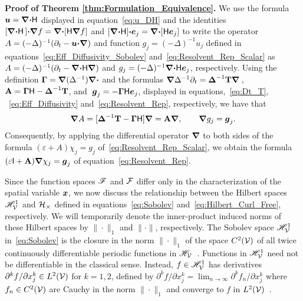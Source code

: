 \documentclass[amsa]{ipart}
\begin{document}
\textbf{Proof of Theorem \ref{thm:Formulation_Equivalence}.}\hspace{1ex}
%
We use the formula $\boldsymbol{u} =\mbox{\boldmath${\nabla}$} \mbox{\boldmath${\cdot}$}\mathsf{H}$ displayed in
equation~\eqref{eq:u_DH} and the identities
$[\mbox{\boldmath${\nabla}$}\mbox{\boldmath${\cdot}$}\mathsf{H}\,]\mbox{\boldmath${\cdot}$}\mbox{\boldmath${\nabla}$} f=\mbox{\boldmath${\nabla}$}\mbox{\boldmath${\cdot}$}[\mathsf{H}\mbox{\boldmath${\nabla}$} f]$
and $[\mbox{\boldmath${\nabla}$}\mbox{\boldmath${\cdot}$}\mathsf{H}]\mbox{\boldmath${\cdot}$}\boldsymbol{e}_j=\mbox{\boldmath${\nabla}$}\mbox{\boldmath${\cdot}$}[\mathsf{H}\boldsymbol{e}_j]$ to 
write the operator $A=(-\Delta)^{-1}(\partial_t-\boldsymbol{u}\mbox{\boldmath${\cdot}$}\mbox{\boldmath${\nabla}$})$ and function
$g_j=(-\Delta)^{-1}u_j$ defined in 
equations~\eqref{eq:Eff_Diffusivity_Sobolev}
and~\eqref{eq:Resolvent_Rep_Scalar} 
as $A=(-\Delta)^{-1}(\partial_t-\mbox{\boldmath${\nabla}$} \mbox{\boldmath${\cdot}$}\mathsf{H}\mbox{\boldmath${\nabla}$})$ and
$g_j=(-\Delta)^{-1}\mbox{\boldmath${\nabla}$} \mbox{\boldmath${\cdot}$}\mathsf{H}\boldsymbol{e} _j$, respectively. Using the definition
$\mbox{\boldmath${\Gamma}$}=\mbox{\boldmath${\nabla}$} (\Delta^{-1})\mbox{\boldmath${\nabla}$} \mbox{\boldmath${\cdot}$}$ and the formulas
$\mbox{\boldmath${\nabla}$} \Delta^{-1}\partial_t=\mbox{\boldmath${\Delta}$}^{-1}\mathbf{T}\mbox{\boldmath${\nabla}$} \,$,
$\mathbf{A}=\mbox{\boldmath${\Gamma}$}\mathsf{H}-\mbox{\boldmath${\Delta}$}^{-1}\mathbf{T}$, and 
$\;\boldsymbol{g}_j=-\mbox{\boldmath${\Gamma}$}\mathsf{H}\boldsymbol{e} _j$, 
displayed in equations,~\eqref{eq:Dt_T}, ~\eqref{eq:Eff_Diffusivity}
and~\eqref{eq:Resolvent_Rep}, respectively, we have that     
%
\begin{align}\label{eq:A_Ab_Relation}
  \bnabla A=[\bDelta^{-1}\Tb-\bGamma\Hm]\bnabla =\Ab\bnabla , \qquad
  \bnabla g_j=\vecg_j.
\end{align}
%
Consequently, by applying the
differential operator $\mbox{\boldmath${\nabla}$} $ to both sides of the formula
$(\varepsilon+A)\chi_j=g_j$ of~\eqref{eq:Resolvent_Rep_Scalar}, we obtain the
formula  $(\varepsilon\mathsf{I}+\mathbf{A})\mbox{\boldmath${\nabla}$} \chi_j=\boldsymbol{g}_j$ of
equation~\eqref{eq:Resolvent_Rep}. 



Since the function spaces $\mathscr{F}$ and $\mathcal{F}$ differ only in the
characterization of the spatial variable $\boldsymbol{x}$, we now discuss the
relationship between the Hilbert spaces $\mathscr{H}^1_{\mathcal{V}}$ and $\mathcal{H}_\times$
defined in equations~\eqref{eq:Sobolev}
and~\eqref{eq:Hilbert_Curl_Free}, respectively. We will temporarily
denote the inner-product induced norms of these Hilbert spaces by
$\|\cdot\|_1$ and $\|\cdot\|$, respectively. The Sobolev space $\mathscr{H}^1_{\mathcal{V}}$
in~\eqref{eq:Sobolev} is the closure in the norm $\|\cdot\|_1$ of the space
$C^2(\mathcal{V})$ of all twice continuously differentiable periodic functions
in $\mathscr{H}_{\mathcal{V}}$~\cite{Bhattacharya:AAP:1999:951}. Functions in
$\mathscr{H}^1_{\mathcal{V}}$ need not be differentiable in the classical
sense. Instead, $f\in\mathscr{H}^1_{\mathcal{V}}$ has derivatives $\partial^kf/\partial x_j^k\in
L^2(\mathcal{V})$ for $k=1,2$, defined by
$\partial^kf/\partial x_j^k=\lim_{n\to\infty}\partial^kf_n/\partial x_j^k$ where $f_n\in C^2(\mathcal{V})$ are
Cauchy in the norm $\|\cdot\|_1$ and converge to $f$ in
$L^2(\mathcal{V})$~\cite{McOwen:2003:PDE}. 
\end{document}
